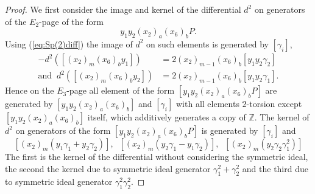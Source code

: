 \documentclass{article}
\theoremstyle{plain}
\theoremstyle{definition}
\numberwithin{thm}{section}
\begin{document}
\begin{proof}
			We first consider the image and kernel of the differential $d^2$ on generators of the $E_2$-page of the form
			\begin{equation*}
				y_1y_2(x_2)_a(x_6)_bP.
			\end{equation*}
			Using (\ref{eq:Sp(2)diff}) the image of $d^2$ on such elements is generated by $[\gamma_i]$,
			\begin{align*}
							   -d^2([(x_2)_m(x_6)_by_1])&=2(x_2)_{m-1}(x_6)_b[y_1y_2\gamma_2]\\
				\text{and} \;\; d^2([(x_2)_m(x_6)_by_2])&=2(x_2)_{m-1}(x_6)_b[y_1y_2\gamma_1].
			\end{align*} 
			Hence on the $E_3$-page all element of the form $[y_1y_2(x_2)_a(x_6)_bP]$ are generated by
			$[y_1y_2(x_2)_a(x_6)_b]$ and $[\gamma_i]$ with all elements $2$-torsion except $[y_1y_2(x_2)_a(x_6)_b]$ itself, 
			which additively generates a copy of $\mathbb{Z}$.
			The kernel of $d^2$ on generators of the form $[y_1y_2(x_2)_a(x_6)_bP]$ is generated by $[\gamma_i]$ and
			\begin{equation}\label{eq:Spd^2KernRow1}
				[(x_2)_m(y_1\gamma_1+y_2\gamma_2)], \;\; [(x_2)_m(y_2\gamma_1-y_1\gamma_2)], \;\; [(x_2)_m(y_2\gamma_2\gamma_1^2)]
			\end{equation}
			The first is the kernel of the differential without considering the symmetric ideal, the second the kernel due to symmetric ideal generator
			$\gamma_1^2+\gamma_2^2$ and the third due to symmetric ideal generator $\gamma_1^2\gamma_2^2$.
			

\end{proof}
\end{document}
